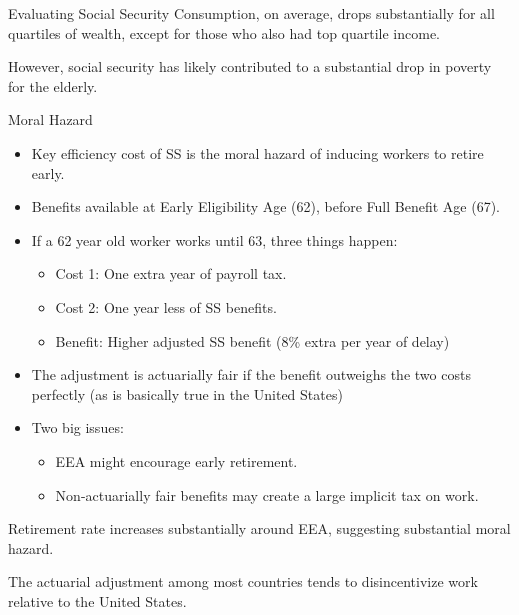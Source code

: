 \documentclass[10pt]{extarticle}
\begin{document}
\begin{problem}{Evaluating Social Security}
    Consumption, on average, drops substantially for all quartiles of wealth, except for those who also had top quartile income.\newline

    However, social security has likely contributed to a substantial drop in poverty for the elderly.
  \end{problem}
  \begin{problem}{Moral Hazard}
    \begin{itemize}
      \item Key efficiency cost of SS is the moral hazard of inducing workers to retire early.
      \item Benefits available at Early Eligibility Age (62), before Full Benefit Age (67).
      \item If a 62 year old worker works until 63, three things happen:
        \begin{itemize}
          \item Cost 1: One extra year of payroll tax.
          \item Cost 2: One year less of SS benefits.
          \item Benefit: Higher adjusted SS benefit (8\% extra per year of delay)
        \end{itemize}
      \item The adjustment is actuarially fair if the benefit outweighs the two costs perfectly (as is basically true in the United States)
      \item Two big issues:
        \begin{itemize}
          \item EEA might encourage early retirement.
          \item Non-actuarially fair benefits may create a large implicit tax on work.
        \end{itemize}
    \end{itemize}
    Retirement rate increases substantially around EEA, suggesting substantial moral hazard.\newline

    The actuarial adjustment among most countries tends to disincentivize work relative to the United States.
  \end{problem}
\end{document}
